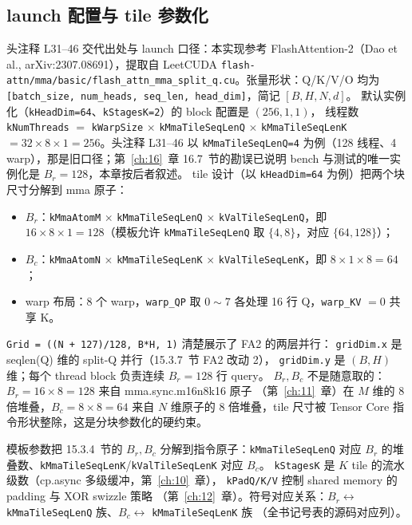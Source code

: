 \subsection{launch 配置与 tile 参数化}

头注释 L31--46 交代出处与 launch 口径：本实现参考 FlashAttention-2（Dao
et al., arXiv:2307.08691），提取自 LeetCUDA
\texttt{flash-attn/mma/basic/flash\_attn\_mma\_split\_q.cu}。张量形状：Q/K/V/O
均为 \texttt{[batch\_size, num\_heads, seq\_len, head\_dim]}，简记 $[B, H, N, d]$。
默认实例化（\texttt{kHeadDim=64}、\texttt{kStagesK=2}）的 block 配置是 $(256, 1, 1)$，
线程数 \texttt{kNumThreads} $=$ \texttt{kWarpSize} $\times$ \texttt{kMmaTileSeqLenQ}
$\times$ \texttt{kMmaTileSeqLenK} $= 32 \times 8 \times 1 = 256$。头注释 L31--46 以
\texttt{kMmaTileSeqLenQ=4} 为例（128 线程、4 warp），那是旧口径；第~\ref{ch:16}~章
16.7~节的勘误已说明 bench 与测试的唯一实例化是 $B_r{=}128$，本章按后者叙述。
tile 设计（以 \texttt{kHeadDim=64} 为例）把两个块尺寸分解到 mma 原子：
\begin{itemize}
  \item $B_r$：\texttt{kMmaAtomM} $\times$ \texttt{kMmaTileSeqLenQ} $\times$
        \texttt{kValTileSeqLenQ}，即 $16 \times 8 \times 1 = 128$（模板允许
        \texttt{kMmaTileSeqLenQ} 取 $\{4,8\}$，对应 $\{64,128\}$）；
  \item $B_c$：\texttt{kMmaAtomN} $\times$ \texttt{kMmaTileSeqLenK} $\times$
        \texttt{kValTileSeqLenK}，即 $8 \times 1 \times 8 = 64$；
  \item warp 布局：8 个 warp，\texttt{warp\_QP} 取 $0 \sim 7$ 各处理 16 行
        Q，\texttt{warp\_KV} $= 0$ 共享 K。
\end{itemize}

\texttt{Grid = ((N + 127)/128,\ B*H,\ 1)} 清楚展示了 FA2 的两层并行：
\texttt{gridDim.x} 是 seqlen(Q) 维的 split-Q 并行（15.3.7~节 FA2 改动 2），
\texttt{gridDim.y} 是 $(B, H)$ 维；每个 thread block 负责连续 $B_r = 128$ 行 query。
$B_r, B_c$ 不是随意取的：$B_r = 16 \times 8 = 128$ 来自 mma.sync.m16n8k16 原子
（第~\ref{ch:11}~章）在 $M$ 维的 $8$ 倍堆叠，$B_c = 8 \times 8 = 64$ 来自 $N$ 维原子的
$8$ 倍堆叠，tile 尺寸被 Tensor Core 指令形状整除，这是分块参数化的硬约束。



模板参数把 15.3.4~节的 $B_r, B_c$ 分解到指令原子：\texttt{k\allowbreak{}Mma\allowbreak{}Tile\allowbreak{}Seq\allowbreak{}Len\allowbreak{}Q} 对应
$B_r$ 的堆叠数、\texttt{k\allowbreak{}Mma\allowbreak{}Tile\allowbreak{}Seq\allowbreak{}Len\allowbreak{}K}/\texttt{k\allowbreak{}Val\allowbreak{}Tile\allowbreak{}Seq\allowbreak{}Len\allowbreak{}K} 对应 $B_c$。
\texttt{kStagesK} 是 $K$ tile 的流水级数（cp.async 多级缓冲，第~\ref{ch:10}~章），
\texttt{kPadQ/K/V} 控制 shared memory 的 padding 与 XOR swizzle 策略
（第~\ref{ch:12}~章）。符号对应关系：$B_r \leftrightarrow$
\texttt{k\allowbreak{}Mma\allowbreak{}Tile\allowbreak{}Seq\allowbreak{}Len\allowbreak{}Q} 族、$B_c \leftrightarrow$ \texttt{k\allowbreak{}Mma\allowbreak{}Tile\allowbreak{}Seq\allowbreak{}Len\allowbreak{}K} 族
（全书记号表的源码对应列）。

